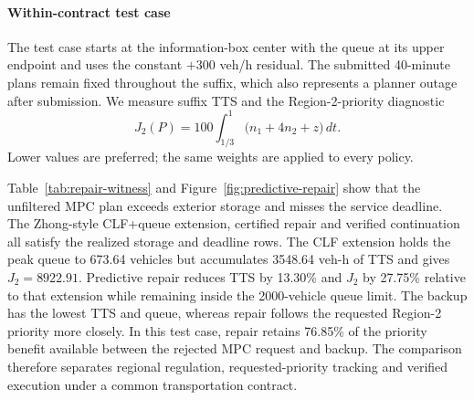 \documentclass[preprint,12pt]{elsarticle}
\numberwithin{equation}{section}
\begin{document}
\paragraph{Within-contract test case}
The test case starts at the information-box center with the queue at its
upper endpoint and uses the constant $+300$ veh/h residual. The submitted
40-minute plans remain fixed throughout the suffix, which also represents a
planner outage after submission. We measure suffix TTS and the
Region-2-priority diagnostic
\begin{equation}
J_2(P)=100\int_{1/3}^{1}\bigl(n_1+4n_2+z\bigr)\,dt.
\label{eq:repair-priority}
\end{equation}
Lower values are preferred; the same weights are applied to every policy.

Table~\ref{tab:repair-witness} and Figure~\ref{fig:predictive-repair} show
that the unfiltered MPC plan exceeds exterior storage and misses the service
deadline. The Zhong-style CLF+queue extension, certified repair and verified
continuation all satisfy the realized storage and deadline rows. The CLF
extension holds the peak queue to 673.64 vehicles but accumulates 3548.64
veh-h of TTS and gives $J_2=8922.91$. Predictive repair reduces TTS by
13.30\% and $J_2$ by 27.75\% relative to that extension while remaining
inside the 2000-vehicle queue limit. The backup has the lowest TTS and queue,
whereas repair follows the requested Region-2 priority more closely. In this
test case, repair retains 76.85\% of the priority benefit available between the
rejected MPC request and backup. The comparison therefore separates regional
regulation, requested-priority tracking and verified execution under a common
transportation contract.
\end{document}
